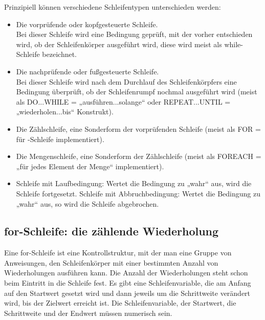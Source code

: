 Prinzipiell können verschiedene Schleifentypen  unterschieden werden:
\begin{itemize}
  \item Die vorprüfende oder kopfgesteuerte Schleife. \\
    Bei dieser Schleife wird eine Bedingung geprüft, mit der vorher entschieden wird, ob der Schleifenkörper ausgeführt wird, diese wird meist als  while-Schleife bezeichnet.
  \item Die nachprüfende oder fußgesteuerte Schleife. \\
    Bei dieser Schleife wird nach dem Durchlauf des Schleifenkörpfers eine Bedingung überprüft, ob der Schleifenrumpf nochmal ausgeführt wird (meist als DO...WHILE = „ausführen...solange“ oder REPEAT...UNTIL = „wiederholen...bis“ Konstrukt).

  \item Die Zählschleife, eine Sonderform der vorprüfenden Schleife (meist als FOR = für -Schleife implementiert). \\
  \item Die Mengenschleife, eine Sonderform der Zählschleife (meist als FOREACH = „für jedes Element der Menge“ implementiert).
  \item Schleife mit Laufbedingung: Wertet die Bedingung zu „wahr“ aus, wird die Schleife fortgesetzt.
    Schleife mit Abbruchbedingung: Wertet die Bedingung zu „wahr“ aus, so wird die Schleife abgebrochen.
\end{itemize}


\subsection{for-Schleife: die zählende Wiederholung}

Eine for-Schleife ist eine Kontrollstruktur, mit der man eine Gruppe von Anweisungen, den Schleifenkörper mit einer bestimmten Anzahl von Wiederholungen ausführen kann.
Die Anzahl der Wiederholungen steht schon beim Eintritt in die Schleife fest. Es gibt eine Schleifenvariable, die am Anfang auf den Startwert gesetzt wird und dann jeweils um die Schrittweite verändert wird, bis der Zielwert erreicht ist. Die Schleifenvariable, der Startwert, die Schrittweite und der Endwert müssen numerisch sein. 

